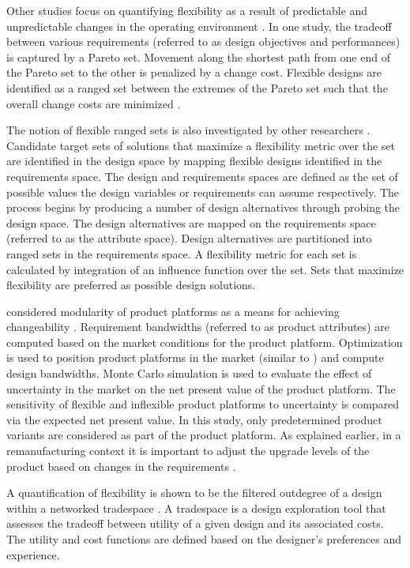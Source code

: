 Other studies focus on quantifying flexibility as a result of predictable and unpredictable changes in the operating environment \cite{Olewnik2004,Liu2008}. In one study, the tradeoff between various requirements (referred to as design objectives and performances) is captured by a Pareto set. Movement along the shortest path from one end of the Pareto set to the other is penalized by a change cost. Flexible designs are identified as a ranged set between the extremes of the Pareto set such that the overall change costs are minimized \cite{Olewnik2004}.

The notion of flexible ranged sets is also investigated by other researchers \cite{Liu2008}. Candidate target sets of solutions that maximize a flexibility metric over the set are identified in the design space by mapping flexible designs identified in the requirements space. The design and requirements spaces are defined as the set of possible values the design variables or requirements can assume respectively. The process begins by producing a number of design alternatives through probing the design space. The design alternatives are mapped on the requirements space (referred to as the attribute space). Design alternatives are partitioned into ranged sets in the requirements space. A flexibility metric for each set is calculated by integration of an influence function over the set. Sets that maximize flexibility are preferred as possible design solutions.

\citeauthor{Suh2007} considered {modularity} of product platforms as a means for achieving changeability \cite{Suh2007}. Requirement bandwidths (referred to as product attributes) are computed based on the market conditions for the product platform. Optimization is used to position product platforms in the market (similar to \citeauthor{Kwak2013} \cite{Kwak2013}) and compute design bandwidths. Monte Carlo simulation is used to evaluate the effect of uncertainty in the market on the net present value of the product platform. The sensitivity of flexible and inflexible product platforms to uncertainty is compared via the expected net present value. In this study, only predetermined product variants are considered as part of the product platform. As explained earlier, in a remanufacturing context it is important to adjust the upgrade levels of the product based on changes in the requirements \cite{Kwak2013}.

A quantification of flexibility is shown to be the filtered outdegree of a design within a networked tradespace \cite{Ross2008}. A tradespace is a design exploration tool that assesses the tradeoff between utility of a given design and its associated costs. The utility and cost functions are defined based on the designer's preferences and experience.


